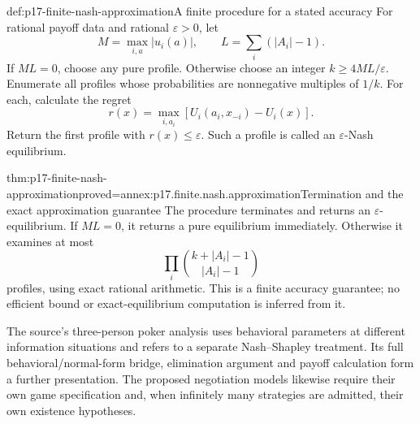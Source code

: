 \begin{hbdefinition}{def:p17-finite-nash-approximation}{A finite procedure for a stated accuracy}
For rational payoff data and rational \(\varepsilon>0\), let
\[
 M=\max_{i,a}|u_i(a)|,\qquad L=\sum_i(|A_i|-1).
\]
If \(ML=0\), choose any pure profile. Otherwise choose an integer
\(k\geq4ML/\varepsilon\). Enumerate all profiles whose
probabilities are nonnegative multiples of \(1/k\).
For each, calculate the regret
\[
                    r(x)=\max_{i,a_i}[U_i(a_i,x_{-i})-U_i(x)].
\]
Return the first profile with \(r(x)\leq\varepsilon\).
Such a profile is called an \(\varepsilon\)-Nash equilibrium.
\end{hbdefinition}

\begin{hbtheorem}{thm:p17-finite-nash-approximation}{proved=annex:p17.finite.nash.approximation}{Termination and the exact approximation guarantee}
The procedure terminates and returns an \(\varepsilon\)-equilibrium.
If \(ML=0\), it returns a pure equilibrium immediately.
Otherwise it examines at most
\[
                         \prod_i {k+|A_i|-1\choose |A_i|-1}
\]
profiles, using exact rational arithmetic. This is a finite
accuracy guarantee; no efficient bound or exact-equilibrium
computation is inferred from it.
\end{hbtheorem}

The source's three-person poker analysis uses behavioral parameters
at different information situations and refers to a separate
Nash--Shapley treatment. Its full behavioral/normal-form bridge,
elimination argument and payoff calculation form a further
presentation. The proposed negotiation models likewise require
their own game specification and, when infinitely many strategies
are admitted, their own existence hypotheses.
